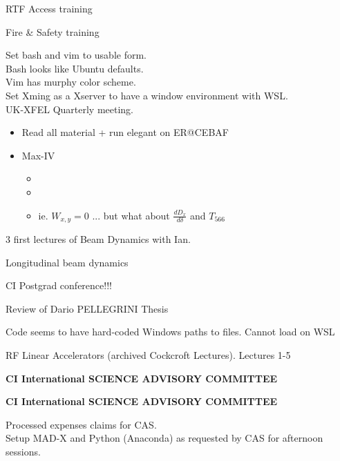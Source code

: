 
RTF Access training



Fire \& Safety training



Set bash and vim to usable form.\\
Bash looks like Ubuntu defaults.\\
Vim has murphy color scheme.\\
Set Xming as a Xserver to have a window environment with WSL.\\
UK-XFEL Quarterly meeting.



\begin{itemize}
\item Read all material + run elegant on ER@CEBAF
\item Max-IV
\begin{itemize}

    \item {}
    \item {}
    \item {}
ie. $ W_{x,y}=0 $ ... but what about $\frac{dD_{x}}{d\delta}$ and $T_{566}$
\end{itemize}
\end{itemize}




3 first lectures of Beam Dynamics with Ian.


Longitudinal beam dynamics

CI Postgrad conference!!!



Review of Dario PELLEGRINI Thesis

Code seems to have hard-coded Windows paths to files. Cannot load on WSL



RF Linear Accelerators (archived Cockcroft Lectures). Lectures 1-5


\textbf{CI International SCIENCE ADVISORY COMMITTEE}


\textbf{CI International SCIENCE ADVISORY COMMITTEE}


Processed expenses claims for CAS.\\
Setup MAD-X and Python (Anaconda) as requested by CAS for afternoon sessions.